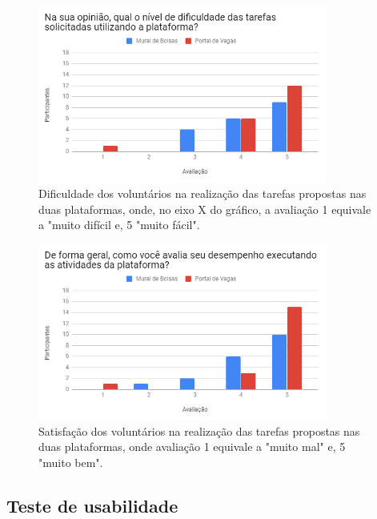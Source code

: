 \begin{figure}[ht]
    \caption{Dificuldade dos voluntários na realização das tarefas propostas nas duas plataformas, onde, no eixo X do gráfico, a avaliação 1 equivale a "muito difícil e, 5 "muito fácil".}
       	\begin{center}
            \includegraphics[width=0.85\textwidth]{figuras/avaliacao/ab-dificuldade.png}
        \end{center}
    \label{avalGrafABDesemp}
\end{figure} 

\begin{figure}[H]
    \caption{Satisfação dos voluntários na realização das tarefas propostas nas duas plataformas, onde avaliação 1 equivale a "muito mal" e, 5 "muito bem".}
       	\begin{center}
            \includegraphics[width=0.85\textwidth]{figuras/avaliacao/ab-desempenho.png}
        \end{center}
    \label{avalGrafABSatisfacao}
\end{figure} 

\subsection{Teste de usabilidade}
\label {avaliacaoUsabilidade}


